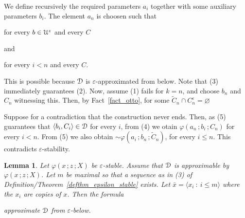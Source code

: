 \documentclass{amsproc}
\makeatletter
\newcounter{thm}
\theoremstyle{mio}
\newtheorem{lemma}[thm]{Lemma}\tcolorboxenvironment{lemma}{mythm}
\providecommand{\proofNameStyle}{\bfseries}
\renewenvironment{proof}[1][\proofname]{\par
  \pushQED{\qed}%
  \normalfont%
  \trivlist
  \item[\hskip\labelsep
        \proofNameStyle
    #1\@addpunct{.}]\ignorespaces
}{%
  \popQED\endtrivlist\@endpefalse
}
\makeatother
\begin{document}
\begin{proof}
  We define recursively the required parameters $a_i$ together with some auxiliary parameters $b_i$.
  The element $a_n$ is choosen such that

\hfill for every $b\in{\EuScript U}^z$ and every $C$

and

\hfill for every $i<n$ and every $C$.\smallskip

This is possible because ${\EuScript D}$ is $\varepsilon$-approximated from below.
Note that (3) immediately guarantees (2).
Now, assume (1) fails for $k=n$, and choose $b_n$ and $C_n$ witnessing this.
Then, by Fact~\ref{fact_otto}, for some $\tilde C_n\cap C_n^\varepsilon=\varnothing$


Suppose for a contradiction that the construction never ends.
Then, as (5) guarantees that $\langle b_i,C_i\rangle\in{\EuScript D}$ for every $i$, from (4) we otain $\varphi(a_n\,;b_i\,;C_n)$ for every $i<n$.
From (5) we also obtain ${\sim}\varphi(a_i\,;b_n\,;\tilde C_n)$, for every $i\le n$.
This contradicts $\varepsilon$-stability.
\end{proof}

\begin{lemma}
  Let $\varphi(x\,;z\,;X)$ be $\varepsilon$-stable.
  Assume that ${\EuScript D}$ is approximable by $\varphi(x\,;z\,;X)$.
  Let $m$ be maximal so that a sequence as in (3) of Definition/Theorem~\ref{defthm_epsilon_stable} exists.
  Let $\bar x=\langle x_i\ :\ i\le m\rangle$ where the $x_i$ are copies of $x$.
  Then the formula\smallskip

  \smallskip

  approximate ${\EuScript D}$ from $\varepsilon$-below.
\end{lemma}
\end{document}
